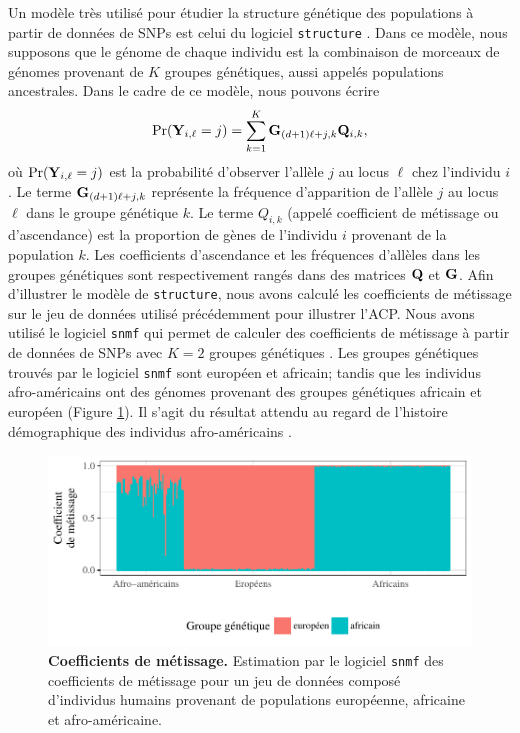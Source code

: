 \documentclass[12pt,a4paper,twoside]{ugathesis}
\begin{document}
Un modèle très utilisé pour étudier la structure génétique des populations à
partir de données de SNPs est celui du logiciel \texttt{structure} \citep{Pritchard2000}.
Dans ce modèle, nous supposons que le génome de chaque individu est la
combinaison de morceaux de génomes provenant de \(K\) groupes génétiques, aussi
appelés populations ancestrales. Dans le cadre de ce modèle, nous pouvons écrire
\begin{equation}
\label{eq:structure}
\Pr(\mathbf{Y}_{i,\ell} = j) = \sum_{k = 1}^{K} \mathbf{G}_{(d + 1)\ell + j, k} \mathbf{Q}_{i,k},
\end{equation}
où \(\Pr(\mathbf{Y}_{i,\ell} = j)\) est la probabilité d'observer l'allèle \(j\) au locus
\(\ell\) chez l'individu \(i\). Le terme \(\mathbf{G}_{(d + 1)\ell + j, k}\) représente la
fréquence d'apparition de l'allèle \(j\) au locus \(\ell\) dans le groupe génétique
\(k\). Le terme \(Q_{i,k}\) (appelé coefficient de métissage ou d'ascendance) est la
proportion de gènes de l'individu \(i\) provenant de la population \(k\). Les
coefficients d'ascendance et les fréquences d'allèles dans les groupes
génétiques sont respectivement rangés dans des matrices \(\mathbf{Q}\) et \(\mathbf{G}\). Afin
d'illustrer le modèle de \texttt{structure}, nous avons calculé les coefficients de
métissage sur le jeu de données utilisé précédemment pour illustrer l'ACP. Nous
avons utilisé le logiciel \texttt{snmf} qui permet de calculer des coefficients de
métissage à partir de données de SNPs avec \(K = 2\) groupes génétiques
\citep{Frichot_2015}. Les groupes génétiques trouvés par le logiciel \texttt{snmf} sont
européen et africain; tandis que les individus afro-américains ont des génomes
provenant des groupes génétiques africain et européen (Figure
\ref{fig:tess3_intro}). Il s'agit du résultat attendu au regard de l'histoire
démographique des individus afro-américains \citep{tishkoff2009genetic}.

\begin{figure}[h]
\centering
\includegraphics{./OUTPUT/Rplots/tess3_intro_barplot.pdf}
\caption{{\bf Coefficients de métissage.} Estimation par le logiciel
  \texttt{snmf} des coefficients de métissage pour un jeu de données composé
  d'individus humains provenant de populations européenne, africaine et
  afro-américaine.}
\label{fig:tess3_intro}
\end{figure}
\end{document}
